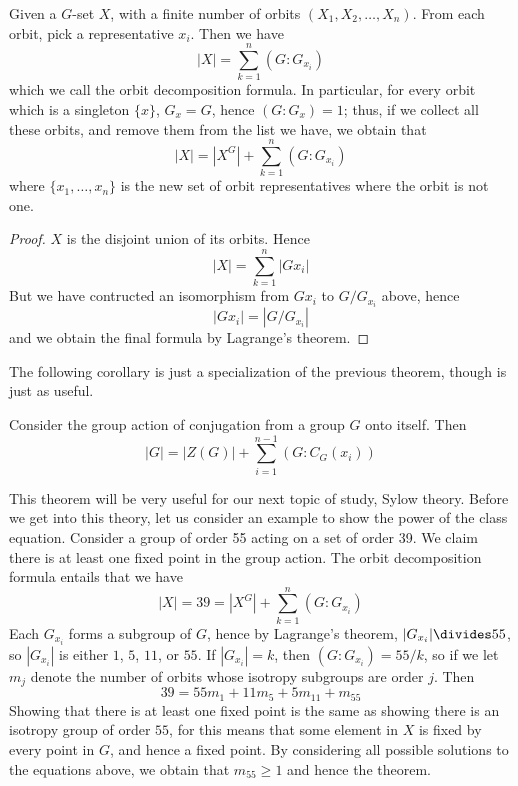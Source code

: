 \begin{corollary} 
    Given a $G$-set $X$, with a finite number of orbits $(X_1, X_2, \dots, X_n)$. From each orbit, pick a representative $x_i$. Then we have
    \[ |X| = \sum_{k=1}^n (G:G_{x_i}) \]
    which we call the orbit decomposition formula. In particular, for every orbit which is a singleton $\{ x \}$, $G_x = G$, hence $(G:G_x) = 1$; thus, if we collect all these orbits, and remove them from the list we have, we obtain that
    \[ |X| = |X^G| + \sum_{k=1}^{n} (G:G_{x_i}) \]
    where $\{ x_1, \dots, x_n \}$ is the new set of orbit representatives where the orbit is not one.
\end{corollary}
\begin{proof}
    $X$ is the disjoint union of its orbits. Hence
    \[ |X| = \sum_{k=1}^n |Gx_i| \]
    But we have contructed an isomorphism from $Gx_i$ to $G/G_{x_i}$ above, hence
    \[ |Gx_i| = |G/G_{x_i}| \]
    and we obtain the final formula by Lagrange's theorem.
\end{proof}

The following corollary is just a specialization of the previous theorem, though is just as useful.

\begin{corollary} 
    Consider the group action of conjugation from a group $G$ onto itself. Then
    \[ |G| = |Z(G)| + \sum_{i = 1}^{n-1} (G:C_G(x_i)) \]
\end{corollary}

This theorem will be very useful for our next topic of study, Sylow theory. Before we get into this theory, let us consider an example to show the power of the class equation. Consider a group of order 55 acting on a set of order 39. We claim there is at least one fixed point in the group action. The orbit decomposition formula entails that we have
%
\[ |X| = 39 = |X^G| + \sum_{k=1}^n (G:G_{x_i}) \]
%
Each $G_{x_i}$ forms a subgroup of $G$, hence by Lagrange's theorem, $|G_{x_i}| \divides 55$, so $|G_{x_i}|$ is either $1$, $5$, $11$, or $55$. If $|G_{x_i}| = k$, then $(G:G_{x_i}) = 55/k$, so if we let $m_j$ denote the number of orbits whose isotropy subgroups are order $j$. Then
%
\[ 39 = 55m_1 + 11m_5 + 5m_{11} + m_{55} \]
%
Showing that there is at least one fixed point is the same as showing there is an isotropy group of order $55$, for this means that some element in $X$ is fixed by every point in $G$, and hence a fixed point. By considering all possible solutions to the equations above, we obtain that $m_{55} \geq 1$ and hence the theorem.

